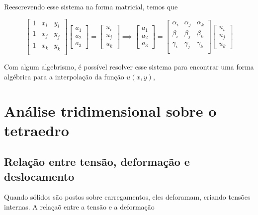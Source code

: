 Reescrevendo esse sistema na forma matricial, temos que

\begin{equation}
    \begin{bmatrix}
        1 & x_i & y_i \\
        1 & x_j & y_j \\
        1 & x_k & y_k \\
    \end{bmatrix}
    \begin{bmatrix}
        a_1 \\ a_2 \\ a_3
    \end{bmatrix}
    = \begin{bmatrix}
        u_i \\ u_j \\ u_k
    \end{bmatrix} \implies
    \begin{bmatrix}
        a_1 \\ a_2 \\ a_3
    \end{bmatrix} =
    \begin{bmatrix}
        \alpha_i & \alpha_j & \alpha_k \\
        \beta_i & \beta_j & \beta_k \\
        \gamma_i & \gamma_j & \gamma_k \\
    \end{bmatrix}
    \begin{bmatrix}
        u_i \\ u_j \\ u_k
    \end{bmatrix}
\end{equation}



Com algum algebrismo, é possível resolver esse sistema para encontrar uma forma algébrica para a interpolação da função $u(x,y)$,

\section{Análise tridimensional sobre o tetraedro}

\subsection{Relação entre tensão, deformação e deslocamento}

Quando sólidos são postos sobre carregamentos, eles deforamam, criando tensões internas. A relaçaõ entre a tensão e a deformação

